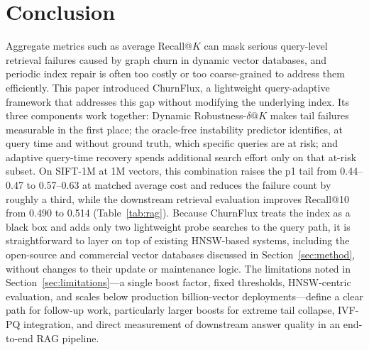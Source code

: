 \documentclass{ieeeaccess}
\begin{document}
\section{Conclusion}
\label{sec:conclusion}
Aggregate metrics such as average Recall@$K$ can mask serious query-level retrieval failures caused by graph churn in dynamic vector databases, and periodic index repair is often too costly or too coarse-grained to address them efficiently. This paper introduced ChurnFlux, a lightweight query-adaptive framework that addresses this gap without modifying the underlying index. Its three components work together: Dynamic Robustness-$\delta@K$ makes tail failures measurable in the first place; the oracle-free instability predictor identifies, at query time and without ground truth, which specific queries are at risk; and adaptive query-time recovery spends additional search effort only on that at-risk subset. On SIFT-1M at 1M vectors, this combination raises the p1 tail from 0.44--0.47 to 0.57--0.63 at matched average cost and reduces the failure count by roughly a third, while the downstream retrieval evaluation improves Recall@10 from 0.490 to 0.514 (Table~\ref{tab:rag}). Because ChurnFlux treats the index as a black box and adds only two lightweight probe searches to the query path, it is straightforward to layer on top of existing HNSW-based systems, including the open-source and commercial vector databases discussed in Section~\ref{sec:method}, without changes to their update or maintenance logic. The limitations noted in Section~\ref{sec:limitations}---a single boost factor, fixed thresholds, HNSW-centric evaluation, and scales below production billion-vector deployments---define a clear path for follow-up work, particularly larger boosts for extreme tail collapse, IVF-PQ integration, and direct measurement of downstream answer quality in an end-to-end RAG pipeline.
\end{document}
